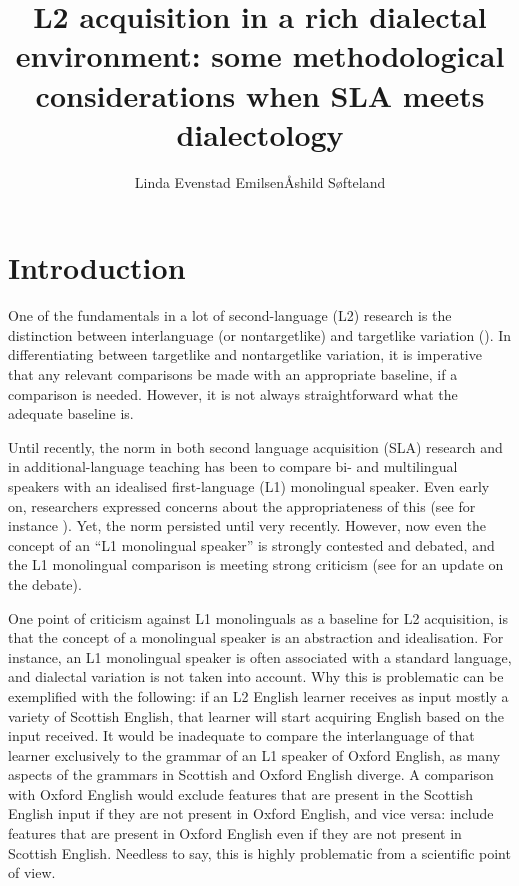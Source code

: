 \documentclass[output=paper,colorlinks,citecolor=brown,modfonts,nonflat]{../langscibook}
\author{Linda Evenstad Emilsen\affiliation{Østfold University College}\orcid{}\lastand Åshild Søfteland\affiliation{Østfold University College}}
\title{L2 acquisition in a rich dialectal environment: some methodological considerations when SLA meets dialectology}
\begin{document}
\maketitle
{}

\section{Introduction}

One of the fundamentals in a lot of second-language (L2) research is the distinction between interlanguage (or nontargetlike) and targetlike variation (\citealt{GassMadden1985}). In differentiating between targetlike and nontargetlike variation, it is imperative that any relevant comparisons be made with an appropriate baseline, if a comparison is needed. However, it is not always straightforward what the adequate baseline is. 

Until recently, the norm in both second language acquisition (SLA) research and in additional-language teaching has been to compare bi- and multilingual speakers with an idealised first-language (L1) monolingual speaker. Even early on, researchers expressed concerns about the appropriateness of this (see for instance \citealt{Bley-Vroman1983, Klein1998}). Yet, the norm persisted until very recently. However, now even the concept of an “L1 monolingual speaker” is strongly contested and debated, and the L1 monolingual comparison is meeting strong criticism (see  \citealt{TheDouglasFirGroup2016} for an update on the debate).

One point of criticism against L1 monolinguals as a baseline for L2 acquisition, is that the concept of a monolingual speaker is an abstraction and idealisation. For instance, an L1 monolingual speaker is often associated with a standard language, and dialectal variation is not taken into account. Why this is problematic can be exemplified with the following: if an L2 English learner receives as input mostly a variety of Scottish English, that learner will start acquiring English based on the input received. It would be inadequate to compare the interlanguage of that learner exclusively to the grammar of an L1 speaker of Oxford English, as many aspects of the grammars in Scottish and Oxford English diverge. A comparison with Oxford English would exclude features that are present in the Scottish English input if they are not present in Oxford English, and vice versa: include features that are present in Oxford English even if they are not present in Scottish English. Needless to say, this is highly problematic from a scientific point of view.
\end{document}
